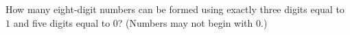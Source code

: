 How many eight-digit numbers can be formed using exactly three digits equal to $1$ and five digits equal to $0$? (Numbers may not begin with $0$.)
